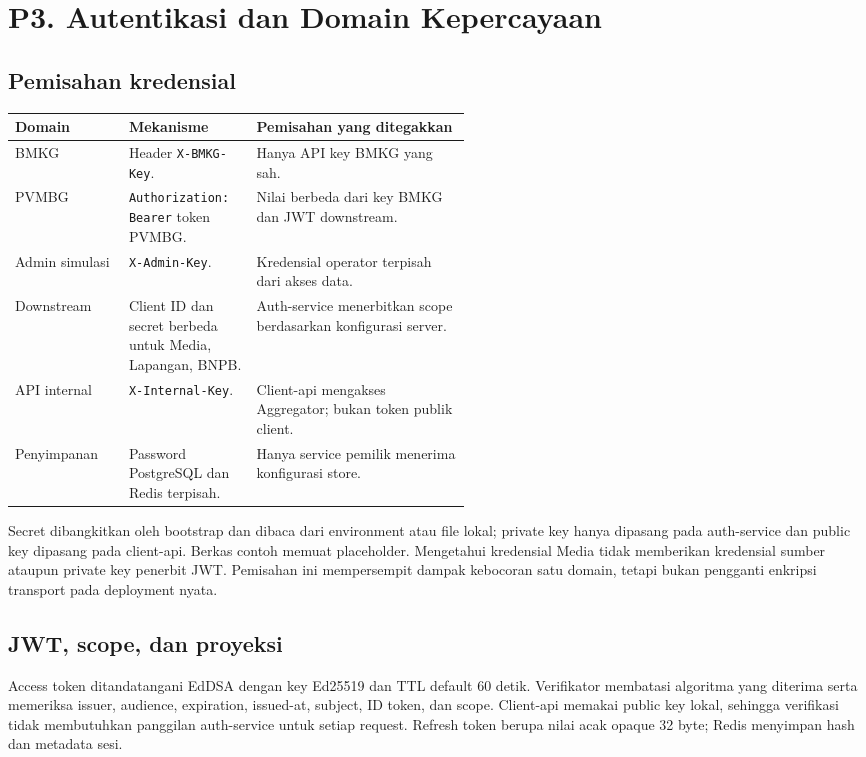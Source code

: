 \section{P3. Autentikasi dan Domain Kepercayaan}
\label{sec:p3}
\subsection{Pemisahan kredensial}
\begin{tabularx}{\linewidth}{P{0.25\linewidth}P{0.28\linewidth}Y}
\toprule Domain & Mekanisme & Pemisahan yang ditegakkan\\\midrule
BMKG & Header \texttt{X-BMKG-Key}. & Hanya API key BMKG yang sah.\\
PVMBG & \texttt{Authorization: Bearer} token PVMBG. & Nilai berbeda dari key BMKG dan JWT downstream.\\
Admin simulasi & \texttt{X-Admin-Key}. & Kredensial operator terpisah dari akses data.\\
Downstream & Client ID dan secret berbeda untuk Media, Lapangan, BNPB. & Auth-service menerbitkan scope berdasarkan konfigurasi server.\\
API internal & \texttt{X-Internal-Key}. & Client-api mengakses Aggregator; bukan token publik client.\\
Penyimpanan & Password PostgreSQL dan Redis terpisah. & Hanya service pemilik menerima konfigurasi store.\\
\bottomrule
\end{tabularx}

Secret dibangkitkan oleh bootstrap dan dibaca dari environment atau file lokal; private key hanya dipasang pada auth-service dan public key dipasang pada client-api. Berkas contoh memuat placeholder. Mengetahui kredensial Media tidak memberikan kredensial sumber ataupun private key penerbit JWT. Pemisahan ini mempersempit dampak kebocoran satu domain, tetapi bukan pengganti enkripsi transport pada deployment nyata.

\subsection{JWT, scope, dan proyeksi}
Access token ditandatangani EdDSA dengan key Ed25519 dan TTL default 60 detik. Verifikator membatasi algoritma yang diterima serta memeriksa issuer, audience, expiration, issued-at, subject, ID token, dan scope. Client-api memakai public key lokal, sehingga verifikasi tidak membutuhkan panggilan auth-service untuk setiap request. Refresh token berupa nilai acak opaque 32 byte; Redis menyimpan hash dan metadata sesi.

